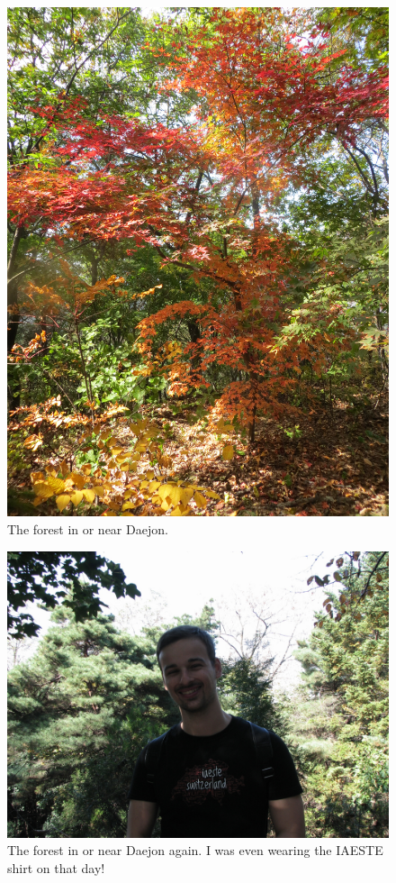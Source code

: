 \begin{figure}[]
	\begin{center}
		\includegraphics*[width=\columnwidth]{photo2.jpg}
	\end{center}
	\caption{The forest in or near Daejon.}
	\label{fig:photo1}
\end{figure}
\begin{figure}[]
	\begin{center}
		\includegraphics*[width=\columnwidth]{photo4.jpg}
	\end{center}
	\caption{The forest in or near Daejon again. I was even wearing the IAESTE shirt on that day!}
	\label{fig:photo1}
\end{figure}
